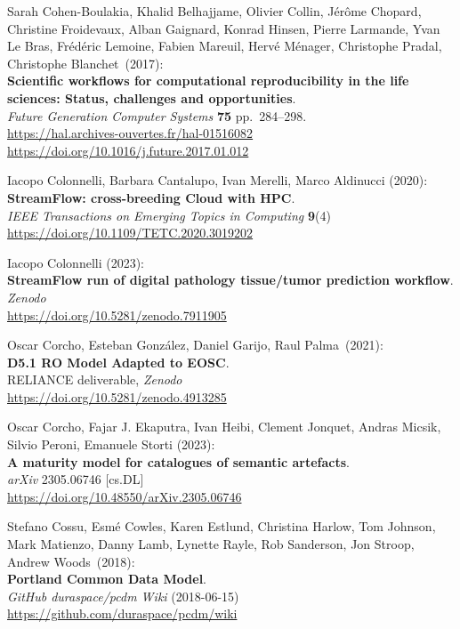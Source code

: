 \begin{thebibliography}{9}
Sarah Cohen-Boulakia, Khalid Belhajjame, Olivier Collin, Jérôme
Chopard, Christine Froidevaux, Alban Gaignard, Konrad Hinsen, Pierre
Larmande, Yvan Le Bras, Frédéric Lemoine, Fabien Mareuil, Hervé Ménager,
Christophe Pradal, Christophe Blanchet~(2017):\\
\textbf{Scientific workflows for computational reproducibility in the
life sciences: Status, challenges and opportunities}.\\
\emph{Future Generation Computer Systems} \textbf{75} pp.~284--298.\\
\url{https://hal.archives-ouvertes.fr/hal-01516082}\\
\url{https://doi.org/10.1016/j.future.2017.01.012}

Iacopo Colonnelli, Barbara Cantalupo, Ivan Merelli, Marco Aldinucci (2020):\\
\textbf{StreamFlow: cross-breeding Cloud with HPC}.\\
\emph{IEEE Transactions on Emerging Topics in Computing} \textbf{9}(4)\\
\url{https://doi.org/10.1109/TETC.2020.3019202}

Iacopo Colonnelli (2023):\\
\textbf{StreamFlow run of digital pathology tissue/tumor prediction workflow}.\\
\emph{Zenodo}\\
\url{https://doi.org/10.5281/zenodo.7911905}

Oscar Corcho, Esteban González, Daniel Garijo, Raul Palma~(2021):\\
\textbf{D5.1 RO Model Adapted to EOSC}.\\
RELIANCE deliverable, \emph{Zenodo}\\
\url{https://doi.org/10.5281/zenodo.4913285}

Oscar Corcho, Fajar J. Ekaputra, Ivan Heibi, Clement Jonquet, Andras
Micsik, Silvio Peroni, Emanuele Storti (2023): \\
\textbf{A maturity model for catalogues of semantic artefacts}. \\
\emph{arXiv} 2305.06746 [cs.DL] \\
\url{https://doi.org/10.48550/arXiv.2305.06746}

Stefano Cossu, Esmé Cowles, Karen Estlund, Christina Harlow,
Tom Johnson, Mark Matienzo, Danny Lamb, Lynette Rayle, Rob Sanderson,
Jon Stroop, Andrew Woods~(2018):\\
\textbf{Portland Common Data Model}.\\
\emph{GitHub duraspace/pcdm Wiki} (2018-06-15)\\
\url{https://github.com/duraspace/pcdm/wiki}


\end{thebibliography}
